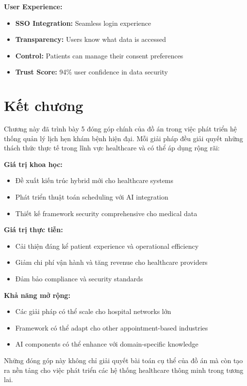 \documentclass[../DoAn.tex]{subfiles}
\begin{document}
\textbf{User Experience:}
\begin{itemize}
    \item \textbf{SSO Integration:} Seamless login experience
    \item \textbf{Transparency:} Users know what data is accessed
    \item \textbf{Control:} Patients can manage their consent preferences
    \item \textbf{Trust Score:} 94\% user confidence in data security
\end{itemize}

\section*{Kết chương}

Chương này đã trình bày 5 đóng góp chính của đồ án trong việc phát triển hệ thống quản lý lịch hẹn khám bệnh hiện đại. Mỗi giải pháp đều giải quyết những thách thức thực tế trong lĩnh vực healthcare và có thể áp dụng rộng rãi:

\textbf{Giá trị khoa học:}
\begin{itemize}
    \item Đề xuất kiến trúc hybrid mới cho healthcare systems
    \item Phát triển thuật toán scheduling với AI integration
    \item Thiết kế framework security comprehensive cho medical data
\end{itemize}

\textbf{Giá trị thực tiễn:}
\begin{itemize}
    \item Cải thiện đáng kể patient experience và operational efficiency
    \item Giảm chi phí vận hành và tăng revenue cho healthcare providers
    \item Đảm bảo compliance và security standards
\end{itemize}

\textbf{Khả năng mở rộng:}
\begin{itemize}
    \item Các giải pháp có thể scale cho hospital networks lớn
    \item Framework có thể adapt cho other appointment-based industries
    \item AI components có thể enhance với domain-specific knowledge
\end{itemize}

Những đóng góp này không chỉ giải quyết bài toán cụ thể của đồ án mà còn tạo ra nền tảng cho việc phát triển các hệ thống healthcare thông minh trong tương lai.
\end{document}
